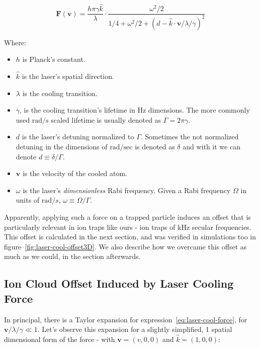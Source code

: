 \begin{equation}
    \mathbf{F}(\mathbf{v}) = \frac{h \pi \gamma \hat{k}}{\lambda} \cdot \frac{\omega^2/2}{1/4 + \omega^2/2 + (d - \hat{k}\cdot\mathbf{v}/\lambda/\gamma)^2}
    \label{eq:laser-cool-force}
\end{equation}

Where:

\begin{itemize}
    \item $h$ is Planck's constant.
    \item $\hat{k}$ is the laser's spatial direction.
    \item $\lambda$ is the cooling transition.
    \item $\gamma$, is the cooling transition's lifetime in Hz dimensions. The more commonly used $\mathrm{rad}/\mathrm{s}$ scaled lifetime is usually denoted as $\Gamma = 2\pi \gamma$.
    \item $d$ is the laser's detuning normalized to $\Gamma$. Sometimes the not normalized detuning in the dimensions of $\mathrm{rad}/\mathrm{sec}$ is denoted as $\delta$ and with it we can denote $d \equiv \delta/\Gamma$.
    \item $\mathbf{v}$ is the velocity of the cooled atom.
    \item $\omega$ is the laser's \emph{dimensionless} Rabi frequency. Given a Rabi frequency $\Omega$ in units of $\mathrm{rad}/s$, $\omega \equiv \Omega/\Gamma$.
\end{itemize}

Apparently, applying such a force on a trapped particle induces an offset that is particularly relevant in ion traps like ours - ion traps of $\mathrm{kHz}$ secular frequencies. This offset is calculated in the next section, and was verified in simulations too in figure~\ref{fig:laser-cool-offset3D}. We also describe how we overcame this offset as much as we could, in the section afterwards.

\subsection{Ion Cloud Offset Induced by Laser Cooling Force}


In principal, there is a Taylor expansion for expression~\ref{eq:laser-cool-force}, for $\mathbf{v}/\lambda/\gamma \ll 1$. Let's observe this expansion for a slightly simplified, 1 spatial dimensional form of the force - with $\mathbf{v} = (v,0,0)$ and $\hat{k} = (1,0,0)$:

